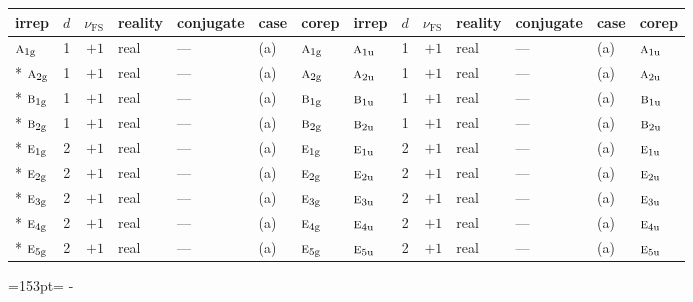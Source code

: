 \documentclass[10pt,a4paper]{article}
\newcommand{\needspace}[1]{\par\penalty-100\begingroup\dimen0=#1\relax\dimen2=\pagegoal
  \advance\dimen2-\pagetotal\ifdim\dimen0>\dimen2\relax\ifdim\dimen2>0pt\vfil\break\fi\fi
  \endgroup}
\numberwithin{equation}{section}
\newcommand{\irr}[1]{\text{\normalfont\scshape #1}}
\newcommand{\ptag}[1]{\mathrm{#1}}
\newcommand{\fsind}{\nu_{\mathrm{FS}}}
\begin{document}
{\small\renewcommand{\arraystretch}{1.25}\setlength{\tabcolsep}{4pt}\begin{longtable}{@{}lrrllll@{\hspace{18pt}}lrrllll@{}}\toprule
irrep & $d$ & $\fsind$ & reality & conjugate & case & corep & irrep & $d$ & $\fsind$ & reality & conjugate & case & corep\\\midrule\endhead
\bottomrule\endfoot\endlastfoot
$\irr{a}_{1\ptag{g}}$ & 1 & $+1$ & real & --- & (a) & $\irr{a}_{1\ptag{g}}$ & $\irr{a}_{1\ptag{u}}$ & 1 & $+1$ & real & --- & (a) & $\irr{a}_{1\ptag{u}}$\\*
$\irr{a}_{2\ptag{g}}$ & 1 & $+1$ & real & --- & (a) & $\irr{a}_{2\ptag{g}}$ & $\irr{a}_{2\ptag{u}}$ & 1 & $+1$ & real & --- & (a) & $\irr{a}_{2\ptag{u}}$\\*
$\irr{b}_{1\ptag{g}}$ & 1 & $+1$ & real & --- & (a) & $\irr{b}_{1\ptag{g}}$ & $\irr{b}_{1\ptag{u}}$ & 1 & $+1$ & real & --- & (a) & $\irr{b}_{1\ptag{u}}$\\*
$\irr{b}_{2\ptag{g}}$ & 1 & $+1$ & real & --- & (a) & $\irr{b}_{2\ptag{g}}$ & $\irr{b}_{2\ptag{u}}$ & 1 & $+1$ & real & --- & (a) & $\irr{b}_{2\ptag{u}}$\\*
$\irr{e}_{1\ptag{g}}$ & 2 & $+1$ & real & --- & (a) & $\irr{e}_{1\ptag{g}}$ & $\irr{e}_{1\ptag{u}}$ & 2 & $+1$ & real & --- & (a) & $\irr{e}_{1\ptag{u}}$\\*
$\irr{e}_{2\ptag{g}}$ & 2 & $+1$ & real & --- & (a) & $\irr{e}_{2\ptag{g}}$ & $\irr{e}_{2\ptag{u}}$ & 2 & $+1$ & real & --- & (a) & $\irr{e}_{2\ptag{u}}$\\*
$\irr{e}_{3\ptag{g}}$ & 2 & $+1$ & real & --- & (a) & $\irr{e}_{3\ptag{g}}$ & $\irr{e}_{3\ptag{u}}$ & 2 & $+1$ & real & --- & (a) & $\irr{e}_{3\ptag{u}}$\\*
$\irr{e}_{4\ptag{g}}$ & 2 & $+1$ & real & --- & (a) & $\irr{e}_{4\ptag{g}}$ & $\irr{e}_{4\ptag{u}}$ & 2 & $+1$ & real & --- & (a) & $\irr{e}_{4\ptag{u}}$\\*
$\irr{e}_{5\ptag{g}}$ & 2 & $+1$ & real & --- & (a) & $\irr{e}_{5\ptag{g}}$ & $\irr{e}_{5\ptag{u}}$ & 2 & $+1$ & real & --- & (a) & $\irr{e}_{5\ptag{u}}$\\
\bottomrule\end{longtable}}
\needspace{153pt}
\end{document}
